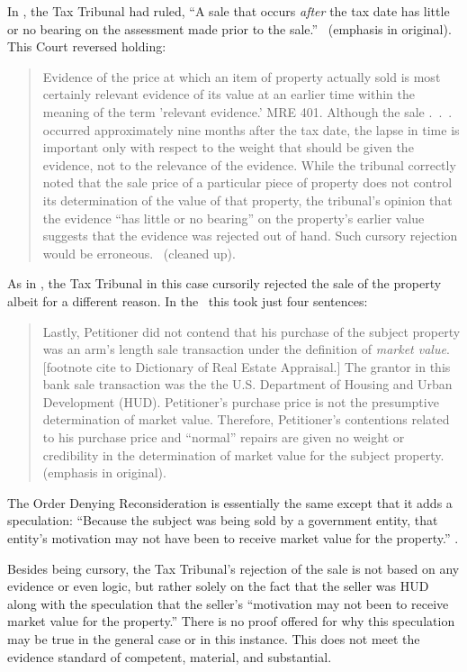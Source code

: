 \documentclass[12pt,\documentclassflag]{michiganCourtOfAppealsBrief}
\begin{document}
In \cite[s]{Jones & Laughlin}, the Tax Tribunal had ruled, ``A sale that occurs \textit{after} the tax date has little or no bearing on the assessment made prior to the sale.'' \ (emphasis in original). This Court reversed holding: 

\begin{quote}
Evidence of the price at which an item of property actually sold is most certainly relevant evidence of its value at an earlier time within the meaning of the term 'relevant evidence.' MRE 401. Although the sale .~.~. occurred approximately nine months after the tax date, the lapse in time is important only with respect to the weight that should be given the evidence, not to the relevance of the evidence. While the tribunal correctly noted that the sale price of a particular piece of property does not control its determination of the value of that property, the tribunal's opinion that the evidence ``has little or no bearing'' on the property's earlier value suggests that the evidence was rejected out of hand. Such cursory rejection would be erroneous. \ (cleaned up).
\end{quote} 

As in \cite[s]{Jones & Laughlin}, the Tax Tribunal in this case cursorily rejected the sale of the property albeit for a different reason. In the \fojAbbr\ this took just four sentences: 

\begin{quote}
	Lastly, Petitioner did not contend that his purchase of the subject property was an arm's length sale transaction under the definition of \textit{market value}. [footnote cite to Dictionary of Real Estate Appraisal.] The grantor in this bank sale transaction was the the U.S. Department of Housing and Urban Development (HUD). Petitioner's purchase price is not the presumptive determination of market value. Therefore, Petitioner's contentions related to his purchase price and ``normal'' repairs are given no weight or credibility in the determination of market value for the subject property. \foj[6] (emphasis in original).
\end{quote}

The Order Denying Reconsideration is essentially the same except that it adds a speculation: ``Because the subject was being sold by a government entity, that entity's motivation may not have been to receive market value for the property.'' \reconsiderationDenied[2].

Besides being cursory, the Tax Tribunal's rejection of the sale is not based on any evidence or even logic, but rather solely on the fact that the seller was HUD along with the speculation that the seller's ``motivation may not been to receive market value for the property.'' There is no proof offered for why this speculation may be true in the general case or in this instance. This does not meet the evidence standard of competent, material, and substantial.
\end{document}
